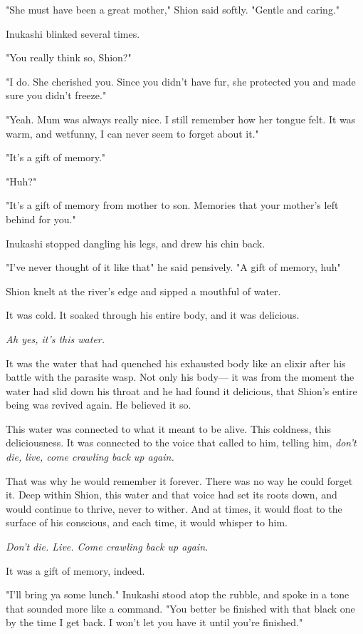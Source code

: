 "She must have been a great mother," Shion said softly. "Gentle and
caring."

Inukashi blinked several times.

"You really think so, Shion?"

"I do. She cherished you. Since you didn't have fur, she protected you
and made sure you didn't freeze."

"Yeah. Mum was always really nice. I still remember how her tongue felt.
It was warm, and wet\el funny, I can never seem to forget about it."

"It's a gift of memory."

"Huh?"

"It's a gift of memory from mother to son. Memories that your mother's
left behind for you."

Inukashi stopped dangling his legs, and drew his chin back.

"I've never thought of it like that\el " he said pensively. "A gift of
memory, huh\el "

Shion knelt at the river's edge and sipped a mouthful of water.

It was cold. It soaked through his entire body, and it was delicious.

\emph{Ah yes, it's this water.}

It was the water that had quenched his exhausted body like an elixir
after his battle with the parasite wasp. Not only his body--- it was from
the moment the water had slid down his throat and he had found it
delicious, that Shion's entire being was revived again. He believed it
so.

This water was connected to what it meant to be alive. This coldness,
this deliciousness. It was connected to the voice that called to him,
telling him, \emph{don't die, live, come crawling back up again.}

That was why he would remember it forever. There was no way he could
forget it. Deep within Shion, this water and that voice had set its
roots down, and would continue to thrive, never to wither. And at times,
it would float to the surface of his conscious, and each time, it would
whisper to him.

\emph{Don't die. Live. Come crawling back up again.}

It was a gift of memory, indeed.

"I'll bring ya some lunch." Inukashi stood atop the rubble, and spoke in
a tone that sounded more like a command. "You better be finished with
that black one by the time I get back. I won't let you have it until
you're finished."

